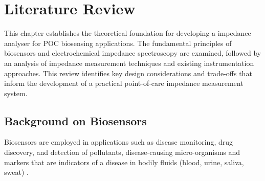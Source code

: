 \graphicspath{{literature_review/fig/}}

\chapter{Literature Review}
This chapter establishes the theoretical foundation for developing a impedance analyser for \ac{POC} biosensing applications. The fundamental principles of biosensors and electrochemical impedance spectroscopy are examined, followed by an analysis of impedance measurement techniques and existing instrumentation approaches. This review identifies key design considerations and trade-offs that inform the development of a practical point-of-care impedance measurement system.
\section{Background on Biosensors}
Biosensors are employed in applications such as disease monitoring, drug discovery, and detection of pollutants, disease-causing micro-organisms and markers that are indicators of a disease in bodily fluids (blood, urine, saliva, sweat) \cite{bhallaIntroductionBiosensors2016}. 




